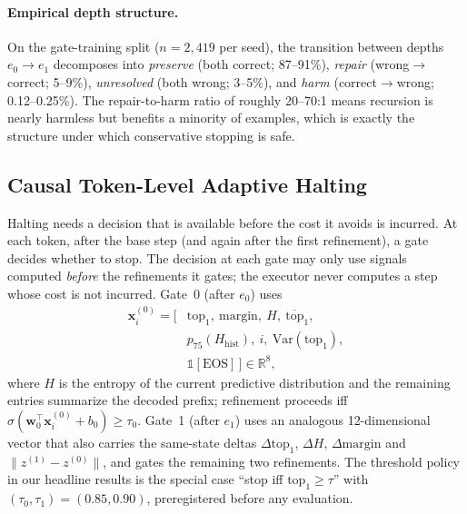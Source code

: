 ﻿\documentclass[11pt]{article}
\begin{document}
\paragraph{Empirical depth structure.}
On the gate-training split ($n{=}2{,}419$ per seed), the transition between depths $e_0 \rightarrow e_1$ decomposes into \emph{preserve} (both correct; 87--91\%), \emph{repair} (wrong$\rightarrow$correct; 5--9\%), \emph{unresolved} (both wrong; 3--5\%), and \emph{harm} (correct$\rightarrow$wrong; 0.12--0.25\%). The repair-to-harm ratio of roughly 20--70:1 means recursion is nearly harmless but benefits a minority of examples, which is exactly the structure under which conservative stopping is safe.

\subsection{Causal Token-Level Adaptive Halting}
\label{sec:halting}
Halting needs a decision that is available before the cost it avoids is incurred. At each token, after the base step (and again after the first refinement), a gate decides whether to stop. The decision at each gate may only use signals computed \emph{before} the refinements it gates; the executor never computes a step whose cost is not incurred. Gate~0 (after $e_0$) uses
\begin{equation}
\begin{aligned}
\mathbf{x}^{(0)}_i = \big[ &\mathrm{top}_1,\ \mathrm{margin},\ H,\ \overline{\mathrm{top}}_1,\\
 &p_{75}(H_{\mathrm{hist}}),\ i,\ \mathrm{Var}(\mathrm{top}_1),\\
 &\mathbb{1}[\mathrm{EOS}]\,\big] \in \mathbb{R}^8,
\end{aligned}
\label{eq:gate0}
\end{equation}
where $H$ is the entropy of the current predictive distribution and the remaining entries summarize the decoded prefix; refinement proceeds iff $\sigma(\mathbf{w}_0^\top \mathbf{x}^{(0)}_i + b_0) \geq \tau_0$. Gate~1 (after $e_1$) uses an analogous 12-dimensional vector that also carries the same-state deltas $\Delta\mathrm{top}_1$, $\Delta H$, $\Delta\mathrm{margin}$ and $\lVert z^{(1)}-z^{(0)}\rVert$, and gates the remaining two refinements. The threshold policy in our headline results is the special case ``stop iff $\mathrm{top}_1 \geq \tau$'' with $(\tau_0,\tau_1)=(0.85,0.90)$, preregistered before any evaluation.
\end{document}

